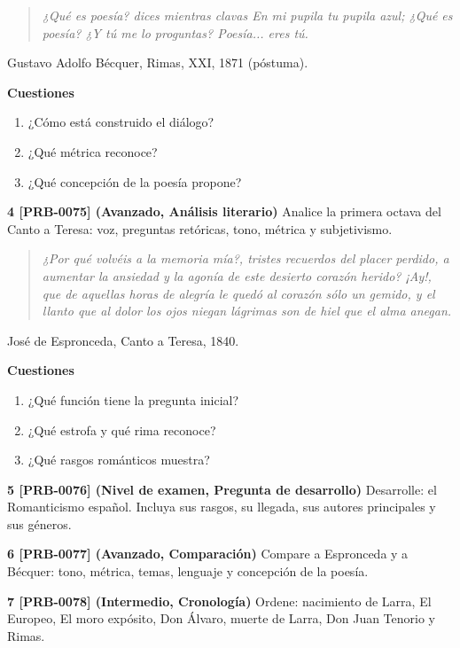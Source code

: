 \documentclass{book}
\begin{document}
\begin{tcolorbox}[title={Ejercicios}, studiumworked, breakable]
\begin{quote}
\itshape ¿Qué es poesía? dices mientras clavas En mi pupila tu pupila azul; ¿Qué es poesía? ¿Y tú me lo proguntas? Poesía... eres tú.
\end{quote}
{\noindent\footnotesize Gustavo Adolfo Bécquer, Rimas, XXI, 1871 (póstuma).\par}

\noindent\textbf{Cuestiones}
\begin{enumerate}
\item ¿Cómo está construido el diálogo?
\item ¿Qué métrica reconoce?
\item ¿Qué concepción de la poesía propone?
\end{enumerate}

\noindent\textbf{4 [PRB-0075] (Avanzado, Análisis literario)}
Analice la primera octava del Canto a Teresa: voz, preguntas retóricas, tono, métrica y subjetivismo.


\begin{quote}
\itshape ¿Por qué volvéis a la memoria mía?, tristes recuerdos del placer perdido, a aumentar la ansiedad y la agonía de este desierto corazón herido? ¡Ay!, que de aquellas horas de alegría le quedó al corazón sólo un gemido, y el llanto que al dolor los ojos niegan lágrimas son de hiel que el alma anegan.
\end{quote}
{\noindent\footnotesize José de Espronceda, Canto a Teresa, 1840.\par}

\noindent\textbf{Cuestiones}
\begin{enumerate}
\item ¿Qué función tiene la pregunta inicial?
\item ¿Qué estrofa y qué rima reconoce?
\item ¿Qué rasgos románticos muestra?
\end{enumerate}

\noindent\textbf{5 [PRB-0076] (Nivel de examen, Pregunta de desarrollo)}
Desarrolle: el Romanticismo español. Incluya sus rasgos, su llegada, sus autores principales y sus géneros.


\noindent\textbf{6 [PRB-0077] (Avanzado, Comparación)}
Compare a Espronceda y a Bécquer: tono, métrica, temas, lenguaje y concepción de la poesía.


\noindent\textbf{7 [PRB-0078] (Intermedio, Cronología)}
Ordene: nacimiento de Larra, El Europeo, El moro expósito, Don Álvaro, muerte de Larra, Don Juan Tenorio y Rimas.

\end{tcolorbox}
\end{document}
